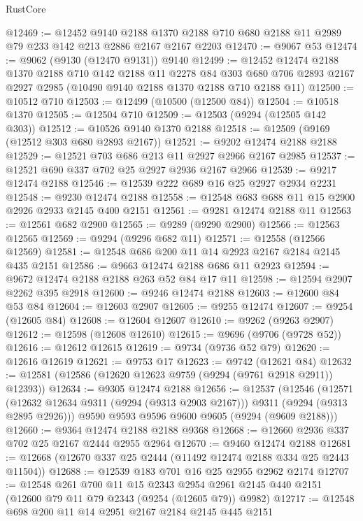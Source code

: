 \begin{lexlean}{RustCore}
\begin{coremodule}
@12469 := @12452
    @9140
    @2188
    @1370
    @2188
    @710
    @680
    @2188
    @11
    @2989
    @79
    @233
    @142
    @213
    @2886
    @2167
    @2167
    @2203
@12470 := @9067 @53
@12474 := @9062 (@9130 (@12470 @9131)) @9140
@12499 := @12452
    @12474
    @2188
    @1370
    @2188
    @710
    @142
    @2188
    @11
    @2278
    @84
    @303
    @680
    @706
    @2893
    @2167
    @2927
    @2985
    (@10490 @9140 @2188 @1370 @2188 @710 @2188 @11)
@12500 := @10512 @710
@12503 := @12499 (@10500 (@12500 @84))
@12504 := @10518 @1370
@12505 := @12504 @710
@12509 := @12503 (@9294 (@12505 @142 @303))
@12512 := @10526 @9140 @1370 @2188
@12518 := @12509 (@9169 (@12512 @303 @680 @2893 @2167))
@12521 := @9202 @12474 @2188 @2188
@12529 := @12521 @703 @686 @213 @11 @2927 @2966 @2167 @2985
@12537 := @12521 @690 @337 @702 @25 @2927 @2936 @2167 @2966
@12539 := @9217 @12474 @2188
@12546 := @12539 @222 @689 @16 @25 @2927 @2934 @2231
@12548 := @9230 @12474 @2188
@12558 := @12548 @683 @688 @11 @15 @2900 @2926 @2933 @2145 @400 @2151
@12561 := @9281 @12474 @2188 @11
@12563 := @12561 @682 @2900
@12565 := @9289 (@9290 @2900)
@12566 := @12563 @12565
@12569 := @9294 (@9296 @682 @11)
@12571 := @12558 (@12566 @12569)
@12581 := @12548 @686 @200 @11 @14 @2923 @2167 @2184 @2145 @435 @2151
@12586 := @9663 @12474 @2188 @686 @11 @2923
@12594 := @9672 @12474 @2188 @2188 @263 @52 @84 @17 @11
@12598 := @12594 @2907 @2262 @395 @2918
@12600 := @9246 @12474 @2188
@12603 := @12600 @84 @53 @84
@12604 := @12603 @2907
@12605 := @9255 @12474
@12607 := @9254 (@12605 @84)
@12608 := @12604 @12607
@12610 := @9262 (@9263 @2907)
@12612 := @12598 (@12608 @12610)
@12615 := @9696 (@9706 (@9728 @52))
@12616 := @12612 @12615
@12619 := @9734 (@9736 @52 @79)
@12620 := @12616 @12619
@12621 := @9753 @17
@12623 := @9742 (@12621 @84)
@12632 := @12581 (@12586 (@12620 @12623 @9759 (@9294 (@9761 @2918 @2911)) @12393))
@12634 := @9305 @12474 @2188
@12656 := @12537
    (@12546
      (@12571 (@12632 @12634 @9311 (@9294 (@9313 @2903 @2167))) @9311 (@9294 (@9313 @2895 @2926)))
      @9590
      @9593
      @9596
      @9600
      @9605
      (@9294 (@9609 @2188)))
@12660 := @9364 @12474 @2188 @2188 @9368
@12668 := @12660 @2936 @337 @702 @25 @2167 @2444 @2955 @2964
@12670 := @9460 @12474 @2188
@12681 := @12668 (@12670 @337 @25 @2444 (@11492 @12474 @2188 @334 @25 @2443 @11504))
@12688 := @12539 @183 @701 @16 @25 @2955 @2962 @2174
@12707 := @12548
    @261
    @700
    @11
    @15
    @2343
    @2954
    @2961
    @2145
    @440
    @2151
    (@12600 @79 @11 @79 @2343 (@9254 (@12605 @79)) @9982)
@12717 := @12548 @698 @200 @11 @14 @2951 @2167 @2184 @2145 @445 @2151

\end{coremodule}
\end{lexlean}
